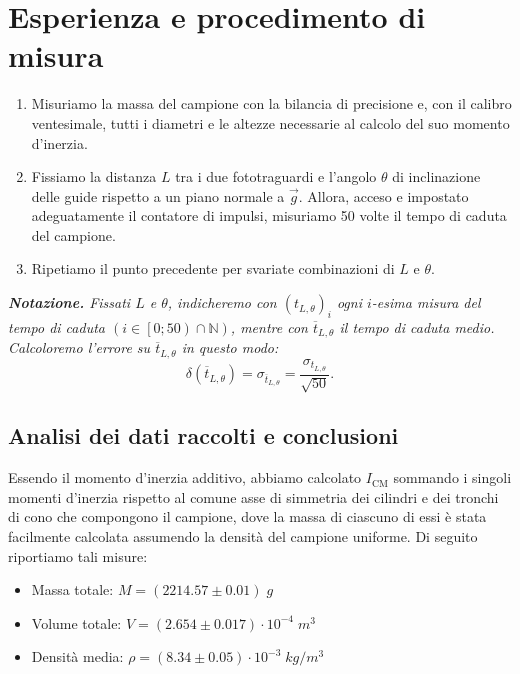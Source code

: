 \documentclass{article}
\begin{document}
\section{Esperienza e procedimento di misura}
\begin{enumerate}
    \item
        Misuriamo la massa del campione con la bilancia di precisione
        e, con il calibro ventesimale, tutti i diametri e le altezze
        necessarie al calcolo del suo momento d'inerzia.
    \item
        Fissiamo la distanza $L$ tra i due fototraguardi
        e l'angolo $\theta$ di inclinazione delle guide
        rispetto a un piano normale a $\vec{g}$.
        Allora, acceso e impostato adeguatamente il contatore di impulsi,
        misuriamo 50 volte il tempo di caduta del campione.
    \item
        Ripetiamo il punto precedente per svariate combinazioni
        di $L$ e $\theta$.

\end{enumerate}

\emph{
    \textbf{Notazione.} Fissati $L$ e $\theta$,
    indicheremo con $\left(t_{L,\theta}\right)_i$
    ogni $i$-esima misura del tempo di caduta
    $\left(i\in\left[0;50\right)\cap\mathbb{N}\right)$,
    mentre con $\overline{t}_{L,\theta}$ il tempo di caduta medio.
    Calcoloremo l'errore su $\overline{t}_{L,\theta}$ in questo modo:\[
        \delta\!\left(\overline{t}_{L,\theta}\right) =
        \sigma_{\overline{t}_{L,\theta}} =
        \frac{\sigma_{t_{L,\theta}}}{\sqrt{50}}.
    \]
}

\subsection{Analisi dei dati raccolti e conclusioni}
Essendo il momento d'inerzia additivo, abbiamo calcolato
$I_\text{CM}$ sommando i singoli momenti d'inerzia rispetto al comune
asse di simmetria dei cilindri e dei tronchi di cono che compongono il
campione, dove la massa di ciascuno di essi è stata facilmente
calcolata assumendo la densità del campione uniforme.
Di seguito riportiamo tali misure:

\begin{itemize}
    \item Massa totale: $M=(2214.57\pm0.01)\;\unit{g}$
    \item Volume totale: $V=(2.654\pm0.017)\cdot10^{-4}\;\unit{m^3}$
    \item Densità media: $\rho=(8.34\pm0.05)\cdot10^{-3}\;\unit{kg \per m^3}$
\end{itemize}
\end{document}

